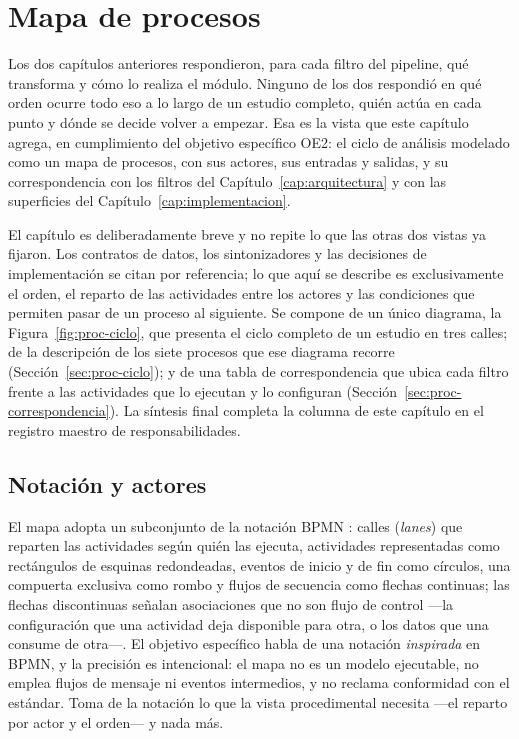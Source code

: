 \documentclass[12pt]{report}
\begin{document}
\chapter{Mapa de procesos}
\label{cap:procesos}

Los dos capítulos anteriores respondieron, para cada filtro del pipeline, qué transforma y cómo lo realiza el módulo. Ninguno de los dos respondió en qué orden ocurre todo eso a lo largo de un estudio completo, quién actúa en cada punto y dónde se decide volver a empezar. Esa es la vista que este capítulo agrega, en cumplimiento del objetivo específico OE2: el ciclo de análisis modelado como un mapa de procesos, con sus actores, sus entradas y salidas, y su correspondencia con los filtros del Capítulo~\ref{cap:arquitectura} y con las superficies del Capítulo~\ref{cap:implementacion}.

El capítulo es deliberadamente breve y no repite lo que las otras dos vistas ya fijaron. Los contratos de datos, los sintonizadores y las decisiones de implementación se citan por referencia; lo que aquí se describe es exclusivamente el orden, el reparto de las actividades entre los actores y las condiciones que permiten pasar de un proceso al siguiente. Se compone de un único diagrama, la Figura~\ref{fig:proc-ciclo}, que presenta el ciclo completo de un estudio en tres calles; de la descripción de los siete procesos que ese diagrama recorre (Sección~\ref{sec:proc-ciclo}); y de una tabla de correspondencia que ubica cada filtro frente a las actividades que lo ejecutan y lo configuran (Sección~\ref{sec:proc-correspondencia}). La síntesis final completa la columna de este capítulo en el registro maestro de responsabilidades.

\section{Notación y actores}
\label{sec:proc-notacion}

El mapa adopta un subconjunto de la notación BPMN \citep{omg:bpmn2013}: calles (\textit{lanes}) que reparten las actividades según quién las ejecuta, actividades representadas como rectángulos de esquinas redondeadas, eventos de inicio y de fin como círculos, una compuerta exclusiva como rombo y flujos de secuencia como flechas continuas; las flechas discontinuas señalan asociaciones que no son flujo de control ---la configuración que una actividad deja disponible para otra, o los datos que una consume de otra---. El objetivo específico habla de una notación \textit{inspirada} en BPMN, y la precisión es intencional: el mapa no es un modelo ejecutable, no emplea flujos de mensaje ni eventos intermedios, y no reclama conformidad con el estándar. Toma de la notación lo que la vista procedimental necesita ---el reparto por actor y el orden--- y nada más.
\end{document}
